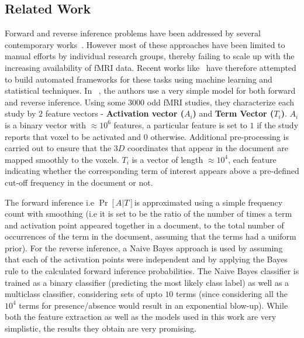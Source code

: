 \documentclass[11pt]{article}
\begin{document}
\subsection{Related Work}
Forward and reverse inference problems have been addressed by several contemporary works~\cite{schwartz2013mapping, PMSKBY12, sanmi2013multi, yarkoni2011large}.
However most of these approaches have been limited to manual efforts by individual research groups, thereby failing to scale up with the increasing availability of fMRI data. Recent works like~\cite{yarkoni2011large, sanmi2013multi} have therefore attempted to build automated frameworks for these tasks using machine learning and statistical techniques.  In ~\cite{yarkoni2011large}, the authors use a very simple model for both forward and reverse inference. Using some $3000$ odd fMRI studies, they characterize each study by $2$ feature vectors - \textbf{Activation vector ($A_i$)} and \textbf{Term Vector ($T_i$)}.  $A_i$ is a binary vector with $\approx 10^6$ features, a particular feature is set to $1$ if the study reports that voxel to be activated and $0$ otherwise. Additional pre-processing is carried out to ensure that the $3D$ coordinates that appear in the document are mapped smoothly to the voxels. $T_i$  is a vector of length $\approx 10^4$, each feature indicating whether the corresponding term of interest appears above a pre-defined cut-off frequency in the document or not. 

The forward inference i.e $\Pr[A \vert T] $is approximated using a simple frequency count with smoothing (i.e it is set to be the ratio of the number of times a term and activation point appeared together in a document, to the total  number of occurrences of the term in the document, assuming that the terms had a uniform prior). For the reverse inference,  a Naive Bayes approach is used by assuming that each of the activation points were independent and by applying the Bayes rule to the calculated forward inference probabilities. The Naive Bayes classifier is trained as a binary classifier (predicting the most likely class label) as well as a multiclass classifier, considering sets of upto $10$ terms (since considering all the $10^4$ terms for presence/absence would result in an exponential blow-up). While both the feature extraction as well as the models used in this work are very simplistic, the results they obtain are very promising. 
\end{document}
